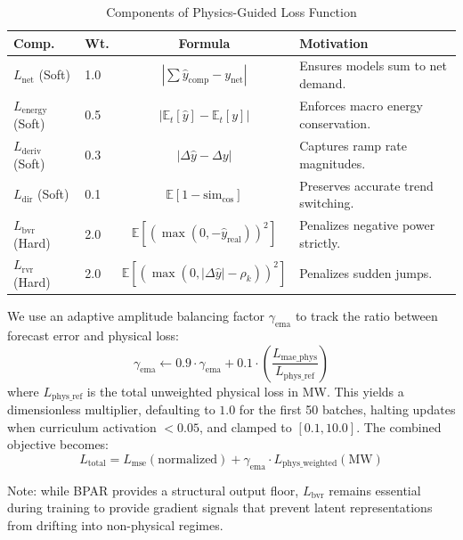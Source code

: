 \begin{table}[htbp]
\caption{Components of Physics-Guided Loss Function}
\label{tab:losses}
\centering
\footnotesize
\setlength{\tabcolsep}{3pt}
\begin{tabularx}{\columnwidth}{@{}llc>{\raggedright\arraybackslash}X@{}}
\toprule
\textbf{Comp.} & \textbf{Wt.} & \textbf{Formula} & \textbf{Motivation} \\ \midrule
$L_{\text{net}}$ (Soft) & 1.0 & $|\sum \hat{y}_{\text{comp}} - y_{\text{net}}|$ & Ensures models sum to net demand. \\
$L_{\text{energy}}$ (Soft) & 0.5 & $|\mathbb{E}_t[\hat{y}] - \mathbb{E}_t[y]|$ & Enforces macro energy conservation. \\
$L_{\text{deriv}}$ (Soft) & 0.3 & $|\Delta \hat{y} - \Delta y|$ & Captures ramp rate magnitudes. \\
$L_{\text{dir}}$ (Soft) & 0.1 & $\mathbb{E} [1 {-} \text{sim}_{\text{cos}}]$ & Preserves accurate trend switching. \\ \midrule
$L_{\text{bvr}}$ (Hard) & 2.0 & $\mathbb{E} [(\max(0, -\hat{y}_{\text{real}}))^2]$ & Penalizes negative power strictly. \\
$L_{\text{rvr}}$ (Hard) & 2.0 & $\mathbb{E} [(\max(0, |\Delta\hat{y}| {-} \rho_k))^2]$ & Penalizes sudden jumps. \\ \bottomrule
\end{tabularx}
\end{table}

We use an adaptive amplitude balancing factor $\gamma_{\text{ema}}$ to track the ratio between forecast error and physical loss:
\begin{equation}
    \gamma_{\text{ema}} \leftarrow 0.9 \cdot \gamma_{\text{ema}} + 0.1 \cdot \left( \frac{L_{\text{mae\_phys}}}{L_{\text{phys\_ref}}} \right)
\label{eq:gamma_ema}
\end{equation}
where $L_{\text{phys\_ref}}$ is the total unweighted physical loss in MW. This yields a dimensionless multiplier, defaulting to $1.0$ for the first 50 batches, halting updates when curriculum activation $< 0.05$, and clamped to $[0.1, 10.0]$. The combined objective becomes:
\begin{equation}
    L_{\text{total}} = L_{\text{mse}}(\text{normalized}) + \gamma_{\text{ema}} \cdot L_{\text{phys\_weighted}}(\text{MW})
\label{eq:total_loss}
\end{equation}

Note: while BPAR provides a structural output floor, $L_{\text{bvr}}$ remains essential during training to provide gradient signals that prevent latent representations from drifting into non-physical regimes.


